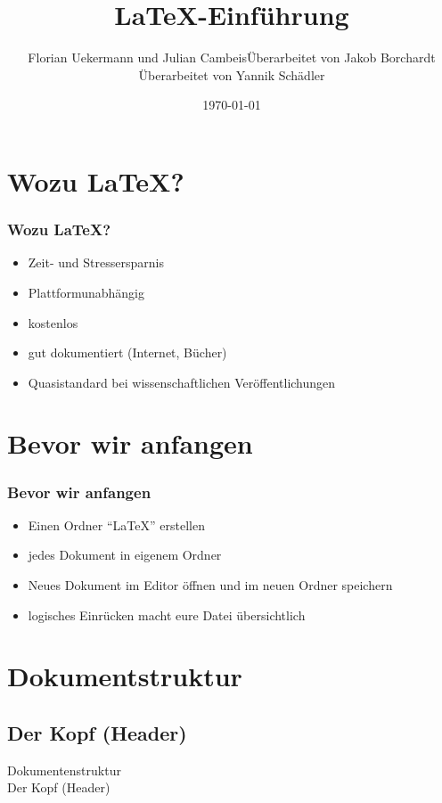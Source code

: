 \documentclass{beamer}
\title{\LaTeX-Einführung}
\author{Florian Uekermann und Julian Cambeis\newline Überarbeitet von Jakob Borchardt \newline Überarbeitet von Yannik Schädler}
\date{\today}
\begin{document}
\begin{frame}
  \titlepage
\end{frame}

\section{Wozu \LaTeX?}
\begin{frame}
  \frametitle{Wozu \LaTeX?}
    \begin{itemize}
      \item<1-> Zeit- und Stressersparnis
      \item<2-> Plattformunabhängig
      \item<3-> kostenlos
      \item<4-> gut dokumentiert (Internet, Bücher)
      \item<5-> Quasistandard bei wissenschaftlichen Veröffentlichungen
    \end{itemize}
\end{frame}

\section{Bevor wir anfangen}
\begin{frame}
\frametitle{Bevor wir anfangen}
  \begin{itemize}
    \item<1-> Einen Ordner "`\LaTeX"' erstellen
    \item<2-> jedes Dokument in eigenem Ordner
    \item<3-> Neues Dokument im Editor öffnen und im neuen Ordner speichern
    \item<4-> logisches Einrücken macht eure Datei übersichtlich
  \end{itemize}
\end{frame}

\section{Dokumentstruktur}
\subsection{Der Kopf (Header)}
\begin{frame}
 \begin{center}
  \Huge Dokumentenstruktur \\
  \Large Der Kopf (Header)
 \end{center}
\end{frame}
\end{document}
